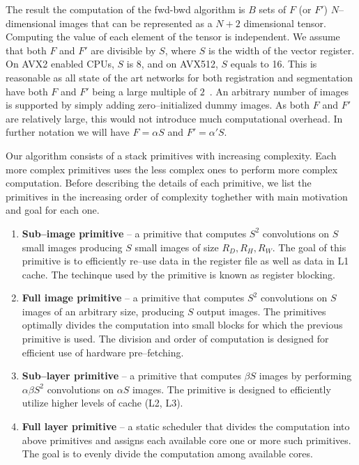   The result the computation of the fwd-bwd algorithm is $B$ sets of
  $F$ (or $F'$) $N$--dimensional images that can be represented as a
  $N+2$ dimensional tensor.  Computing the value of each element of
  the tensor is independent.  We assume that both $F$ and $F'$ are
  divisible by $S$, where $S$ is the width of the vector register.  On
  AVX2 enabled CPUs, $S$ is 8, and on AVX512, $S$ equals to 16.  This
  is reasonable as all state of the art networks for both registration
  and segmentation have both $F$ and $F'$ being a large multiple of
  $2$~\cite{krizhevsky2012imagenet, ronneberger2015u,
    simonyan2014very, sermanet2013overfeat, long2015fully,
    tran2015learning, ji20133d, maturana_iros_2015,
    maturana_icra_2014}.  An arbitrary number of images is supported
  by simply adding zero--initialized dummy images.  As both $F$ and
  $F'$ are relatively large, this would not introduce much
  computational overhead.  In further notation we will have $F =
  \alpha S$ and $F' = \alpha' S$.

  Our algorithm consists of a stack primitives with increasing
  complexity.  Each more complex primitives uses the less complex ones
  to perform more complex computation.  Before describing the details
  of each primitive, we list the primitives in the increasing order of
  complexity toghether with main motivation and goal for each one.

  \begin{enumerate}
  \item {\bf Sub--image primitive} -- a primitive that computes $S^2$
    convolutions on $S$ small images producing $S$ small images of
    size $R_D, R_H, R_W$.  The goal of this primitive is to
    efficiently re--use data in the register file as well as data in
    L1 cache.  The techinque used by the primitive is known as
    register blocking.
  \item {\bf Full image primitive} -- a primitive that computes $S^2$
    convolutions on $S$ images of an arbitrary size, producing $S$
    output images.  The primitives optimally divides the computation
    into small blocks for which the previous primitive is used.  The
    division and order of computation is designed for efficient use of
    hardware pre--fetching.
  \item {\bf Sub--layer primitive} -- a primitive that computes
    $\beta S$ images by performing $\alpha \beta S^2$
    convolutions on $\alpha S$ images.  The primitive is designed to
    efficiently utilize higher levels of cache (L2, L3).
  \item {\bf Full layer primitive} -- a static scheduler that divides
    the computation into above primitives and assigns each available
    core one or more such primitives.  The goal is to evenly divide
    the computation among available cores.
  \end{enumerate}

